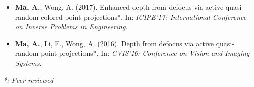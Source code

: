 \begin{adjustwidth}{\indentleft}{\indentright}
\begin{itemize}
            \item \textbf{Ma, A.}, Wong, A. (2017). Enhanced depth from defocus via active quasi-random colored point projections*. In: \emph{ICIPE'17: International Conference on Inverse Problems in Engineering}.
                   
            \item \textbf{Ma, A.}, Li, F., Wong, A. (2016). Depth from defocus via active quasi-random point projections*, In: \emph{CVIS'16: Conference on Vision and Imaging Systems}.
       
        \end{itemize}
        \hfill
        \textit{*: Peer-reviewed}
        
        
 
        
    \end{adjustwidth}
